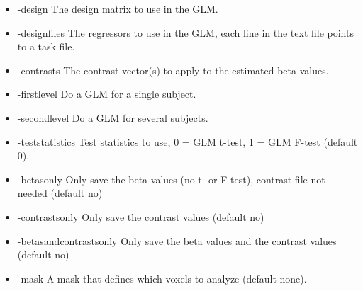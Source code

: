 \begin{itemize}

\item -design
\newline \newline The design matrix to use in the GLM. 

\item -designfiles
\newline \newline The regressors to use in the GLM, each line in the text file points to a task file. 

\item -contrasts                 
\newline \newline The contrast vector(s) to apply to the estimated beta values. 

\item -firstlevel
\newline \newline Do a GLM for a single subject.
 
\item -secondlevel
\newline \newline Do a GLM for several subjects.
 
\item -teststatistics
\newline \newline Test statistics to use, 0 = GLM t-test, 1 = GLM F-test  (default 0).

\item -betasonly
\newline \newline Only save the beta values (no t- or F-test), contrast file not needed (default no)

\item -contrastsonly
\newline \newline Only save the contrast values (default no)

\item -betasandcontrastsonly
\newline \newline Only save the beta values and the contrast values (default no)

\item -mask                      
\newline \newline A mask that defines which voxels to analyze (default none). 
\end{itemize}



